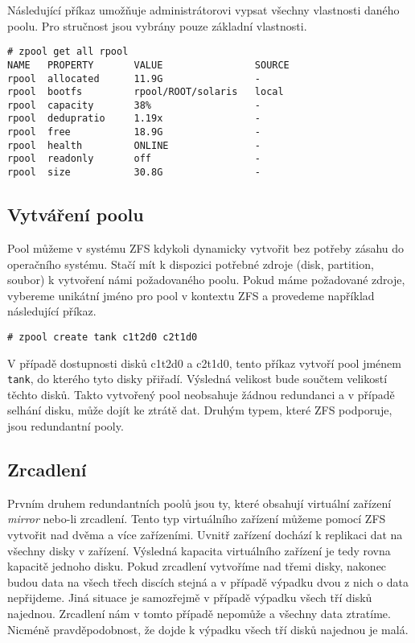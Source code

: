 Následující příkaz umožňuje administrátorovi vypsat všechny vlastnosti daného poolu. Pro stručnost jsou vybrány pouze základní vlastnosti.
\begin{verbatim}
# zpool get all rpool
NAME   PROPERTY       VALUE                SOURCE
rpool  allocated      11.9G                -
rpool  bootfs         rpool/ROOT/solaris   local
rpool  capacity       38%                  -
rpool  dedupratio     1.19x                -
rpool  free           18.9G                -
rpool  health         ONLINE               -
rpool  readonly       off                  -
rpool  size           30.8G                -
\end{verbatim}

\subsection{Vytváření poolu}
Pool můžeme v systému ZFS kdykoli dynamicky vytvořit bez potřeby zásahu do operačního systému. Stačí mít k dispozici potřebné zdroje (disk, partition, soubor) k vytvoření námi požadovaného poolu. Pokud máme požadované zdroje, vybereme unikátní jméno pro pool v kontextu ZFS a provedeme například následující příkaz.
\begin{verbatim}
# zpool create tank c1t2d0 c2t1d0
\end{verbatim}
V případě dostupnosti disků c1t2d0 a c2t1d0, tento příkaz vytvoří pool jménem \verb|tank|, do kterého tyto disky přiřadí. Výsledná velikost bude součtem velikostí těchto disků. Takto vytvořený pool neobsahuje žádnou redundanci a v případě selhání disku, může dojít ke ztrátě dat. Druhým typem, které ZFS podporuje, jsou redundantní pooly.
\subsection{Zrcadlení}
Prvním druhem redundantních poolů jsou ty, které obsahují virtuální zařízení \emph{mirror} nebo-li zrcadlení. Tento typ virtuálního zařízení můžeme pomocí ZFS vytvořit nad dvěma a více zařízeními. Uvnitř zařízení dochází k replikaci dat na všechny disky v zařízení. Výsledná kapacita virtuálního zařízení je tedy rovna kapacitě jednoho disku. Pokud zrcadlení vytvoříme nad třemi disky, nakonec budou data na všech třech discích stejná a v případě výpadku dvou z nich o data nepřijdeme. Jiná situace je samozřejmě v případě výpadku všech tří disků najednou. Zrcadlení nám v tomto případě nepomůže a všechny data ztratíme. Nicméně pravděpodobnost, že dojde k výpadku všech tří disků najednou je malá.

